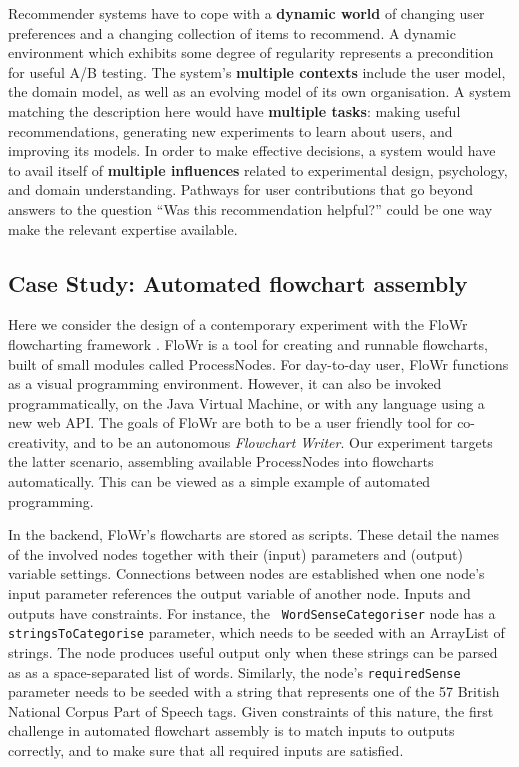 Recommender systems have to cope with a \textbf{dynamic world} of changing user preferences and a changing collection of items to recommend.  A dynamic environment which exhibits some degree of regularity represents a precondition for useful A/B testing.  The system's \textbf{multiple contexts} include the user model, the domain model, as well as an evolving model of its own organisation.  A system matching the description here would have \textbf{multiple tasks}: making useful recommendations, generating new experiments to learn about users, and improving its models.  In order to make effective decisions, a system would have to avail itself of \textbf{multiple influences} related to experimental design, psychology, and domain understanding.  Pathways for user contributions that go beyond answers to the question ``Was this recommendation helpful?'' could be one way make the relevant expertise available.

\subsection{Case Study: Automated flowchart assembly} \label{sec:flowchartassembly}

Here we consider the design of a contemporary experiment with the
{\sf FloWr} flowcharting framework \cite{colton-flowcharting}.  {\sf FloWr} is a
tool for creating and runnable flowcharts, built of small
modules called ProcessNodes.  For day-to-day user, {\sf FloWr} functions as a visual programming environment.  However, it can also be invoked programmatically, on the Java Virtual Machine, or with any language
using a new web API.  The goals of {\sf FloWr} are both to be a user
friendly tool for co-creativity, and to be an autonomous
\emph{Flowchart Writer}.  Our experiment targets the latter scenario,
assembling available ProcessNodes into flowcharts automatically.  This can be viewed as a simple example of automated programming.

In the backend, {\sf FloWr}'s flowcharts are stored as scripts.  These
detail the names of the involved nodes together with their (input)
parameters and (output) variable settings.  Connections between nodes
are established when one node's input parameter references the output
variable of another node.
%
Inputs and outputs have constraints.  For instance, the {\tt
  WordSenseCategoriser} node has a {\tt stringsToCategorise}
parameter, which needs to be seeded with an ArrayList of strings.  The node produces useful output only when these strings can be parsed as as a space-separated list of words.  Similarly, the node's {\tt requiredSense} parameter needs to be seeded with a string that represents one of the 57 British National Corpus Part of Speech tags.  Given constraints of this nature, the first challenge in automated flowchart assembly is to match inputs to outputs correctly, and to make sure that all required inputs are satisfied.

